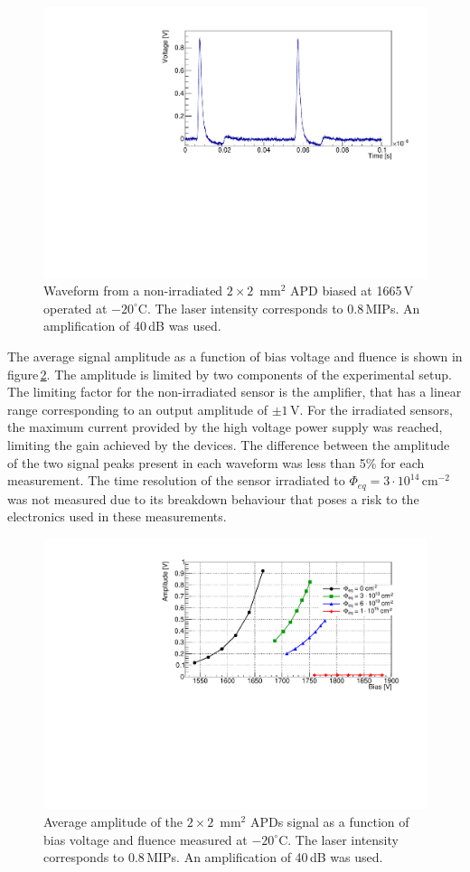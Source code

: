 \documentclass{article}
\begin{document}
\begin{figure}
  \centering
  \includegraphics[width = 0.6 \textwidth]{APD_394-1-51_1665V_evt1100_2pulses}
  \caption{Waveform from a non-irradiated $2 \times 2$~mm$^2$ APD biased at 1665\,V operated at $-20^\circ$C. The laser intensity corresponds to 0.8\,MIPs. An amplification of 40\,dB was used.}
  \label{fig:pulses2x2timing}
\end{figure}

The average signal amplitude as a function of bias voltage and fluence is shown in figure\,\ref{fig:ampli2x2}.
The amplitude is limited by two components of the experimental setup.
The limiting factor for the non-irradiated sensor is the amplifier, that has a linear range corresponding to an output amplitude of $\pm 1$\,V.
For the irradiated sensors, the maximum current provided by the high voltage power supply was reached, limiting the gain achieved by the devices.
The difference between the amplitude of the two signal peaks present in each waveform was less than 5\% for each measurement.
The time resolution of the sensor irradiated to $\Phi_{eq} = 3 \cdot 10^{14}$\,cm$^{-2}$ was not measured due to its breakdown behaviour that poses a risk to the electronics used in these measurements.

\begin{figure}
  \centering
  \includegraphics[width = 0.6 \textwidth]{ampli2x2APDs}
  \caption{Average amplitude of the $2 \times 2$~mm$^2$ APDs signal as a function of bias voltage and fluence measured at $-20^\circ$C. The laser intensity corresponds to 0.8\,MIPs. An amplification of 40\,dB was used.}
  \label{fig:ampli2x2}
\end{figure}
\end{document}
